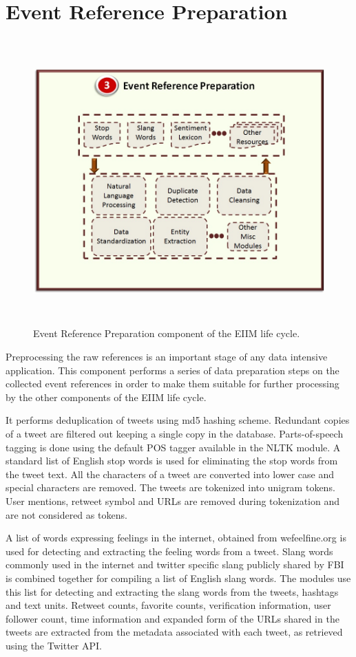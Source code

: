 \section{Event Reference Preparation}

\begin{figure}[htbp]
  \caption{Event Reference Preparation component of the EIIM life cycle.}
  \centering
    \includegraphics[width=14cm,height=11cm]{Figures/EIIMComponents/EventReferencePreparation.jpg}
\end{figure}

Preprocessing the raw references is an important stage of any data intensive application. This component performs a series of data preparation steps on the collected event references in order to make them suitable for further processing by the other components of the EIIM life cycle. 

It performs deduplication of tweets using md5 hashing scheme. Redundant copies of a tweet are filtered out keeping a single copy in the database. Parts-of-speech tagging is done using the default POS tagger available in the NLTK  module. A standard list of English stop words is used for eliminating the stop words from the tweet text. All the characters of a tweet are converted into lower case and special characters are removed. The tweets are tokenized into unigram tokens. User mentions, retweet symbol and URLs are removed during tokenization and are not considered as tokens.

A list of words expressing feelings in the internet, obtained from wefeelfine.org is used for detecting and extracting the feeling words from a tweet. Slang words commonly used in the internet and twitter specific slang publicly shared by FBI  is combined together for compiling a list of English slang words. The modules use this list for detecting and extracting the slang words from the tweets, hashtags and text units. Retweet counts, favorite counts, verification information, user follower count, time information and expanded form of the URLs shared in the tweets are extracted from the metadata associated with each tweet, as retrieved using the Twitter API. 


